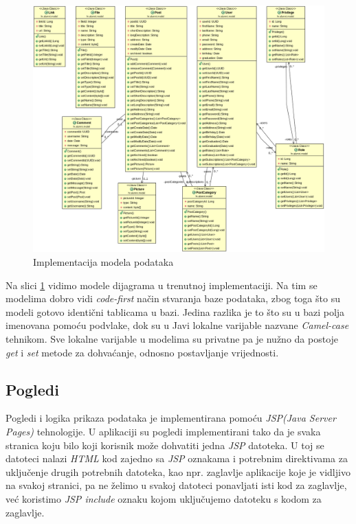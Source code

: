 \documentclass[zavrsni, numeric]{fer}
\begin{document}
\begin{figure}[H]
	\centering
	\includegraphics[width=13cm]{slike/modeli-dijagram.png}
	\caption{Implementacija modela podataka}
	\label{fig:modeli-dijagram}
\end{figure}

Na slici \ref{fig:modeli-dijagram} vidimo modele dijagrama u trenutnoj implementaciji. Na tim se modelima dobro vidi \textit{code-first} način stvaranja baze podataka, zbog toga što su modeli gotovo identični tablicama u bazi. Jedina razlika je to što su u bazi polja imenovana pomoću podvlake, dok su u Javi lokalne varijable nazvane \textit{Camel-case} tehnikom. Sve lokalne varijable u modelima su privatne pa je nužno da postoje \textit{get} i \textit{set} metode za dohvaćanje, odnosno postavljanje vrijednosti.

\subsection{Pogledi}
Pogledi i logika prikaza podataka je implementirana pomoću \textit{JSP(Java Server Pages)} tehnologije.  U aplikaciji su pogledi implementirani tako da je svaka stranica koju bilo koji korisnik može dohvatiti jedna \textit{JSP} datoteka. U toj se datoteci nalazi \textit{HTML} kod zajedno sa \textit{JSP} oznakama i potrebnim direktivama za uključenje drugih potrebnih datoteka, kao npr. zaglavlje aplikacije koje je vidljivo na svakoj stranici, pa ne želimo u svakoj datoteci ponavljati isti kod za zaglavlje, već koristimo \textit{JSP include} oznaku kojom uključujemo datoteku s kodom za zaglavlje.
\end{document}
